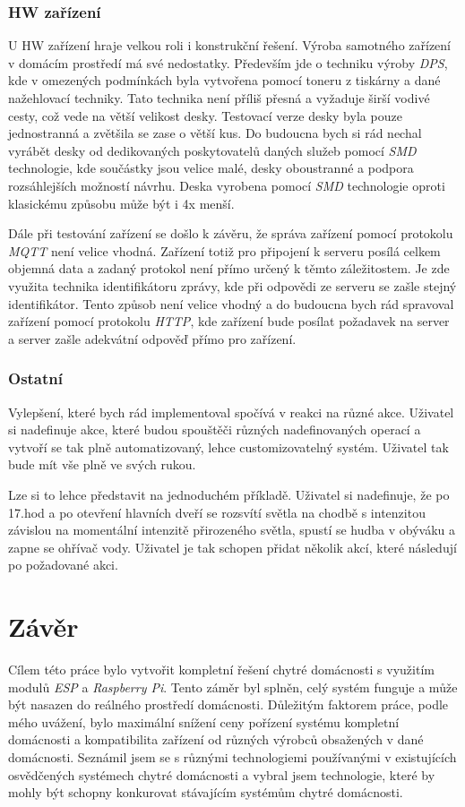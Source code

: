 \subsection*{HW zařízení}
\label{testovani:navrh:hw}
U HW zařízení hraje velkou roli i konstrukční řešení.
Výroba samotného zařízení v domácím prostředí má své nedostatky.
Především jde o techniku výroby \emph{DPS}, kde v omezených podmínkách byla vytvořena pomocí toneru z tiskárny a dané nažehlovací techniky.
Tato technika není příliš přesná a vyžaduje širší vodivé cesty, což vede na větší velikost desky.
Testovací verze desky byla pouze jednostranná a zvětšila se zase o větší kus.
Do budoucna bych si rád nechal vyrábět desky od dedikovaných poskytovatelů daných služeb pomocí \emph{SMD} technologie, kde součástky jsou velice malé, desky oboustranné a podpora rozsáhlejších možností návrhu.
Deska vyrobena pomocí \emph{SMD} technologie oproti klasickému způsobu může být i 4x menší.

Dále při testování zařízení se došlo k závěru, že správa zařízení pomocí protokolu \emph{MQTT} není velice vhodná.
Zařízení totiž pro připojení k serveru posílá celkem objemná data a zadaný protokol není přímo určený k těmto záležitostem.
Je zde využita technika identifikátoru zprávy, kde při odpovědi ze serveru se zašle stejný identifikátor.
Tento způsob není velice vhodný a do budoucna bych rád spravoval zařízení pomocí protokolu \emph{HTTP}, kde zařízení bude posílat požadavek na server a server zašle adekvátní odpověď přímo pro zařízení.

\subsection*{Ostatní}
\label{testovani:navrh:ostatní}
Vylepšení, které bych rád implementoval spočívá v reakci na různé akce.
Uživatel si nadefinuje akce, které budou spouštěči různých nadefinovaných operací a vytvoří se tak plně automatizovaný, lehce customizovatelný systém.
Uživatel tak bude mít vše plně ve svých rukou.

Lze si to lehce představit na jednoduchém příkladě.
Uživatel si nadefinuje, že po 17.hod a po otevření hlavních dveří se rozsvítí světla na chodbě s intenzitou závislou na momentální intenzitě přirozeného světla, spustí se hudba v obýváku a zapne se ohřívač vody.
Uživatel je tak schopen přidat několik akcí, které následují po požadované akci.

\chapter{Závěr}
\label{zaver}
Cílem této práce bylo vytvořit kompletní řešení chytré domácnosti s využitím modulů \emph{ESP} a \emph{Raspberry Pi}.
Tento záměr byl splněn, celý systém funguje a může být nasazen do reálného prostředí domácnosti.
Důležitým faktorem práce, podle mého uvážení, bylo maximální snížení ceny pořízení systému kompletní domácnosti a kompatibilita zařízení od různých výrobců obsažených v dané domácnosti.
Seznámil jsem se s různými technologiemi používanými v existujících osvědčených systémech chytré domácnosti a vybral jsem technologie, které by mohly být schopny konkurovat stávajícím systémům chytré domácnosti.


